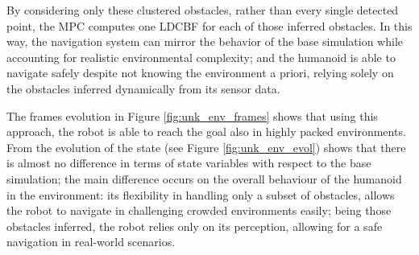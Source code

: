 By considering only these clustered obstacles, rather than every single detected point, the MPC
computes one LDCBF for each of those inferred obstacles. In this way, the navigation system can mirror
the behavior of the base simulation while accounting for realistic environmental complexity; and the humanoid is
able to navigate safely despite not knowing the environment a priori, relying solely on the obstacles inferred dynamically from its sensor data.

The frames evolution in Figure \ref{fig:unk_env_frames} shows that using this approach, the robot is able to reach
the goal also in highly packed environments. From the evolution of the state (see
Figure \ref{fig:unk_env_evol}) shows that there is almost no difference
in terms of state variables with respect to the base simulation; the main difference occurs on the overall behaviour
of the humanoid in the environment: its flexibility in handling only a subset of obstacles, allows the robot to
navigate in challenging crowded environments easily; being those obstacles inferred, the robot relies only on its
perception, allowing for a safe navigation in real-world scenarios.





